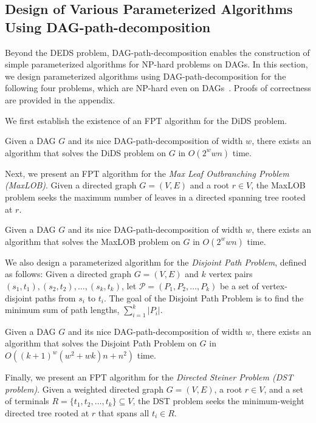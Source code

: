 \documentclass[runningheads]{llncs}
\theoremstyle{plain}
\theoremstyle{definition}
\begin{document}
\subsection{Design of Various Parameterized Algorithms Using DAG-path-decomposition}

Beyond the DEDS problem, DAG-path-decomposition enables the construction of simple parameterized algorithms for NP-hard problems on DAGs.  
In this section, we design parameterized algorithms using DAG-path-decomposition for the following four problems, which are NP-hard even on DAGs~\cite{art17}.  
Proofs of correctness are provided in the appendix.  

We first establish the existence of an FPT algorithm for the DiDS problem.  

\begin{theorem}
    Given a DAG \(G\) and its nice DAG-path-decomposition of width \(w\), there exists an algorithm that solves the DiDS problem on \(G\) in \(O(2^w w n)\) time.  
\end{theorem}

Next, we present an FPT algorithm for the \emph{Max Leaf Outbranching Problem (MaxLOB)}.  
Given a directed graph \(G = (V, E)\) and a root \(r \in V\), the MaxLOB problem seeks the maximum number of leaves in a directed spanning tree rooted at \(r\). 

\begin{theorem}\label{alg_lob}
    Given a DAG \(G\) and its nice DAG-path-decomposition of width \(w\), there exists an algorithm that solves the MaxLOB problem on \(G\) in \(O(2^w w n)\) time.  
\end{theorem}

We also design a parameterized algorithm for the \emph{Disjoint Path Problem}, defined as follows:  
Given a directed graph \(G = (V, E)\) and \(k\) vertex pairs \((s_1, t_1), (s_2, t_2), \dots, (s_k, t_k)\), let \(\mathcal{P} = (P_1, P_2, \dots, P_k)\) be a set of vertex-disjoint paths from \(s_i\) to \(t_i\).  
The goal of the Disjoint Path Problem is to find the minimum sum of path lengths, \(\sum_{i=1}^{k} |P_i|\).  

\begin{theorem}
    Given a DAG \(G\) and its nice DAG-path-decomposition of width \(w\), there exists an algorithm that solves the Disjoint Path Problem on \(G\) in \(O((k+1)^w (w^2 + wk) n + n^2)\) time.  
\end{theorem}

Finally, we present an FPT algorithm for the \emph{Directed Steiner Problem (DST problem)}.  
Given a weighted directed graph \(G = (V, E)\), a root \(r \in V\), and a set of terminals \(R = \{t_1, t_2, \dots, t_k\} \subseteq V\), the DST problem seeks the minimum-weight directed tree rooted at \(r\) that spans all \(t_i \in R\).  
\end{document}

